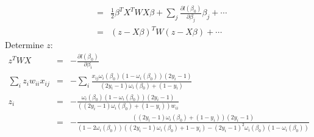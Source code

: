 \documentclass{article}
\begin{document}
\begin{enumerate}
\begin{enumerate}[A]
\begin{eqnarray}
&=&\frac{1}{2}\beta^TX^TWX\beta+\sum_j\frac{\partial l(\beta_0)}{\partial\beta_j}\beta_j+\cdots\nonumber\\
&=&(z-X\beta)^TW(z-X\beta)+\cdots
\end{eqnarray}
Determine $z$:
\begin{eqnarray}
z^TWX&=&-\frac{\partial l(\beta_0)}{\partial\beta_i}\nonumber\\
\sum_iz_iw_{ii}x_{ij}&=&-\sum_i\frac{x_{ij}\omega_i(\beta_0)(1-\omega_i(\beta_0))(2y_i-1)}{(2y_i-1)\omega_i(\beta_0)+(1-y_i)}\nonumber\\
z_i&=&-\frac{\omega_i(\beta_0)(1-\omega_i(\beta_0))(2y_i-1)}{((2y_i-1)\omega_i(\beta_0)+(1-y_i))w_{ii}}\nonumber\\
&=&-\frac{((2y_i-1)\omega_i(\beta_0)+(1-y_i))(2y_i-1)}{(1-2\omega_i(\beta_0))((2y_i-1)\omega_i(\beta_0)+1-y_i)-(2y_i-1)^2\omega_i(\beta_0)(1-\omega_i(\beta_0))}
\end{eqnarray}
\end{enumerate}
\end{enumerate}
\end{document}
